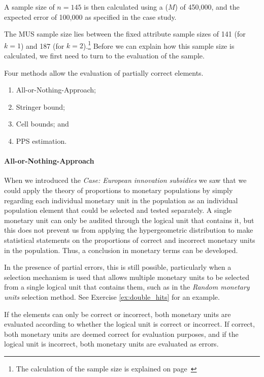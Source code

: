A sample size of $n = 145$ is then calculated using a  ($M$) of 450,000, and the expected error of 100,000 as specified in the case study.

The MUS sample size lies between the fixed attribute sample sizes of 141 (for $k = 1$) and 187 (for $k = 2$).\footnote{The calculation of the sample size is explained on page~\pageref{par:sample_size_calculation}} Before we can explain how this sample size is calculated, we first need to turn to the evaluation of the sample. 

\bigskip
Four methods allow the evaluation of partially correct elements.
\begin{enumerate}[leftmargin=*,labelsep=.5em]
\item All-or-Nothing-Approach;
\item Stringer bound; 
\item Cell bounds; and
\item PPS estimation.
\end{enumerate}

\paragraph{All-or-Nothing-Approach} When we introduced the \emph{Case: European innovation subsidies} we saw that we could apply the theory of proportions to monetary populations by simply regarding each individual monetary unit in the population as an individual population element that could be selected and tested separately. A single monetary unit can only be audited through the logical unit that contains it, but this does not prevent us from applying the hypergeometric distribution to make statistical statements on the proportions of correct and incorrect monetary units in the population. Thus, a conclusion in monetary terms can be developed. 

In the presence of partial errors, this is still possible, particularly when a selection mechanism is used that allows multiple monetary units to be selected from a single logical unit that contains them, such as in the \emph{Random monetary units} selection method. See Exercise \ref{ex:double_hits} for an example.

\bigskip
If the elements can only be correct or incorrect, both monetary units are evaluated according to whether the logical unit is correct or incorrect. If correct, both monetary units are deemed correct for evaluation purposes, and if the logical unit is incorrect, both monetary units are evaluated as errors.


